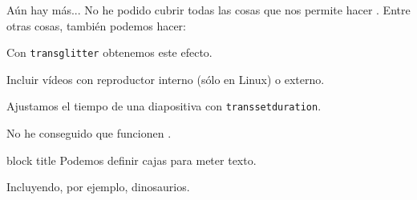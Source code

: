 \begin{frame}{Aún hay más...}
  No he podido cubrir todas las cosas que nos permite hacer \beamer \frownie{}.
  Entre otras cosas, también podemos hacer:
  \espacio
  \begin{description}[<+->]
    \item[Transiciones] Con \texttt{transglitter} obtenemos este efecto.
    \item[Multimedia] Incluir vídeos con reproductor interno (sólo en Linux) o externo.
    \item[Temporización] Ajustamos el tiempo de una diapositiva con \texttt{transsetduration}.
    \item[Animaciones] No he conseguido que funcionen \frownie{}.
    \item[Cajas]
      \begin{beamercolorbox}[shadow=true]{block title}
        Podemos definir cajas para meter texto.
      \end{beamercolorbox}
    \item[Overlays de imágenes] Incluyendo, por ejemplo, dinosaurios.
  \end{description}

\end{frame}
